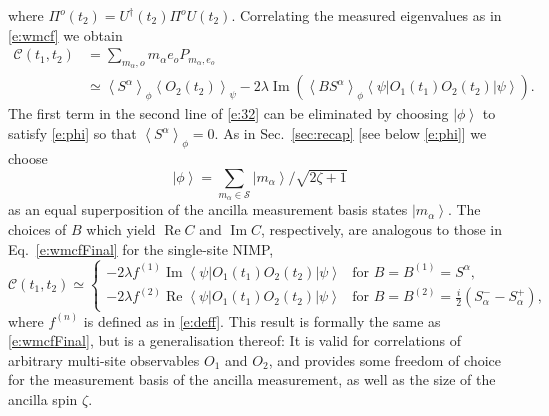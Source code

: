 \documentclass[epjST,numbook]{svjour}
\newcommand{\wmcf}{\mathscr{C}}
\newcommand{\ket}[1]{\left \vert #1 \right >}
\newcommand{\matel}[3]{ \displaystyle \left\langle #1 \right \vert #2 \left\vert  #3 \right\rangle }
\newcommand{\expval}[1]{\left\langle #1 \right\rangle}
\DeclareMathOperator{\imp }{\mathrm{Im}}
\DeclareMathOperator{\rep}{\mathrm{Re}}
\begin{document}
where $\Pi^o(t_2)=U^\dagger(t_2) \Pi^o U(t_2)$.
Correlating the measured eigenvalues as in \eqref{e:wmcf} we obtain
\begin{equation}\label{e:32}
\begin{split}
\wmcf(t_1,t_2) &=\sum_{m_\alpha,o} m_\alpha e_o P_{m_\alpha, e_o}\\ 
&\simeq \expval{S^\alpha}_{\phi} \expval{O_2(t_2)}_{\psi} - 2 \lambda \imp \left(\expval{ B S^\alpha}_{\phi}\matel{\psi}{ O_1(t_1) O_2(t_2) }{\psi}\right).
\end{split}
\end{equation}
The first term in the second line of \eqref{e:32} can be eliminated by choosing $\ket{\phi}$ to satisfy \eqref{e:phi} so that ${\expval{S^\alpha}_{\phi}=0}$. As in Sec.~\ref{sec:recap} [see below \eqref{e:phi}] we choose
\begin{equation}
\ket{\phi}=\sum_{m_\alpha \in \mathscr{S}} \ket{m_\alpha}/\sqrt{2\zeta+1}
\end{equation}
as an equal superposition of the ancilla measurement basis states $\ket{m_\alpha}$. The choices of $B$ which yield $\rep C$ and $\imp C$, respectively, are analogous to those in Eq.~\eqref{e:wmcfFinal} for the single-site NIMP,
\begin{equation}\label{e:genNIMPc}
\wmcf(t_1,t_2) \simeq 
\begin{cases}
-2\lambda f^{(1)} \imp{\matel{\psi}{ O_1(t_1) O_2(t_2) }{\psi}} & \text{for $B=B^{(1)}=S^\alpha$}, \\
-2\lambda f^{(2)} \rep{\matel{\psi}{ O_1(t_1) O_2(t_2) }{\psi}} & \text{for $B=B^{(2)}=\frac{i}{2}\left(S_\alpha^--S_\alpha^+\right)$},
\end{cases}
\end{equation}
where $f^{(n)}$ is defined as in \eqref{e:deff}. This result is formally the same as \eqref{e:wmcfFinal}, but is a generalisation thereof: %
It is valid for correlations of arbitrary multi-site observables $O_1$ and $O_2$, and provides some freedom of choice for the measurement basis of the ancilla measurement, as well as the size of the ancilla spin $\zeta$.
\end{document}

